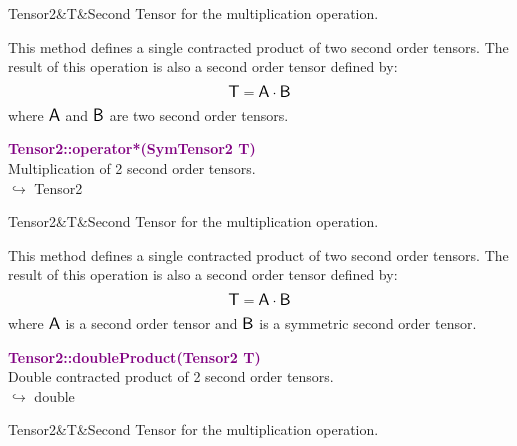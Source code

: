 \begin{tcolorbox}[width=\textwidth,myArgs,tabularx={ll|R},title=Arguments of Tensor2::operator*]
Tensor2&T&Second Tensor for the multiplication operation.
\end{tcolorbox}

This method defines a single contracted product of two second order tensors.
The result of this operation is also a second order tensor defined by:
\begin{equation*}
\mbox{\large\ensuremath{\mathsf{T}}} = \mbox{\large\ensuremath{\mathsf{A}}} \cdot \mbox{\large\ensuremath{\mathsf{B}}}
\end{equation*}
where $\mbox{\large\ensuremath{\mathsf{A}}}$ and $\mbox{\large\ensuremath{\mathsf{B}}}$ are two second order tensors.

\textcolor{purple}{\textbf{Tensor2::operator*(SymTensor2 T)}}\label{Tensor2::operator*(SymTensor2 T)}\\
Multiplication of 2 second order tensors.\\ \hspace*{10mm}$\hookrightarrow$ Tensor2

\begin{tcolorbox}[width=\textwidth,myArgs,tabularx={ll|R},title=Arguments of Tensor2::operator*]
Tensor2&T&Second Tensor for the multiplication operation.
\end{tcolorbox}

This method defines a single contracted product of two second order tensors.
The result of this operation is also a second order tensor defined by:
\begin{equation*}
\mbox{\large\ensuremath{\mathsf{T}}} = \mbox{\large\ensuremath{\mathsf{A}}} \cdot \mbox{\large\ensuremath{\mathsf{B}}}
\end{equation*}
where $\mbox{\large\ensuremath{\mathsf{A}}}$ is a second order tensor and $\mbox{\large\ensuremath{\mathsf{B}}}$ is a symmetric second order tensor.

\textcolor{purple}{\textbf{Tensor2::doubleProduct(Tensor2 T)}}\label{Tensor2::doubleProduct(Tensor2 T)}\\
Double contracted product of 2 second order tensors.\\ \hspace*{10mm}$\hookrightarrow$ double

\begin{tcolorbox}[width=\textwidth,myArgs,tabularx={ll|R},title=Arguments of Tensor2::doubleProduct]
Tensor2&T&Second Tensor for the multiplication operation.
\end{tcolorbox}

